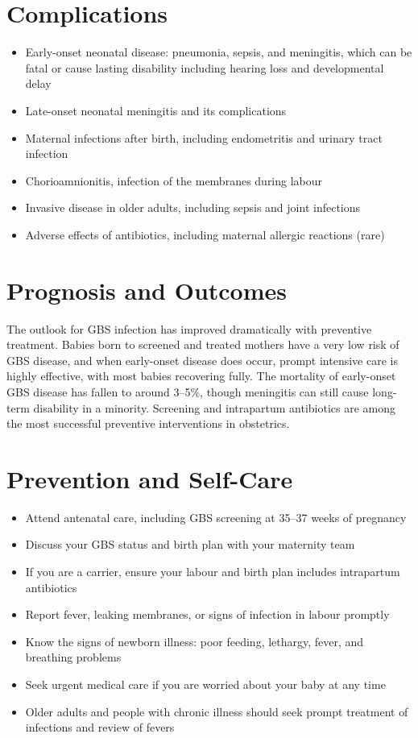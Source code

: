 \section*{Complications}
\begin{itemize}
    \item Early-onset neonatal disease: pneumonia, sepsis, and meningitis, which can be fatal or cause lasting disability including hearing loss and developmental delay
    \item Late-onset neonatal meningitis and its complications
    \item Maternal infections after birth, including endometritis and urinary tract infection
    \item Chorioamnionitis, infection of the membranes during labour
    \item Invasive disease in older adults, including sepsis and joint infections
    \item Adverse effects of antibiotics, including maternal allergic reactions (rare)
\end{itemize}

\section*{Prognosis and Outcomes}
The outlook for GBS infection has improved dramatically with preventive treatment. Babies born to screened and treated mothers have a very low risk of GBS disease, and when early-onset disease does occur, prompt intensive care is highly effective, with most babies recovering fully. The mortality of early-onset GBS disease has fallen to around 3--5\%, though meningitis can still cause long-term disability in a minority. Screening and intrapartum antibiotics are among the most successful preventive interventions in obstetrics.

\section*{Prevention and Self-Care}
\begin{itemize}
    \item Attend antenatal care, including GBS screening at 35--37 weeks of pregnancy
    \item Discuss your GBS status and birth plan with your maternity team
    \item If you are a carrier, ensure your labour and birth plan includes intrapartum antibiotics
    \item Report fever, leaking membranes, or signs of infection in labour promptly
    \item Know the signs of newborn illness: poor feeding, lethargy, fever, and breathing problems
    \item Seek urgent medical care if you are worried about your baby at any time
    \item Older adults and people with chronic illness should seek prompt treatment of infections and review of fevers
\end{itemize}

